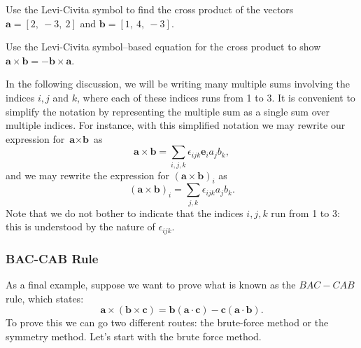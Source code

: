 \begin{exercise}{}
Use the Levi-Civita symbol to find the cross product of the vectors $\textbf{a}=[2,~-3,~2]$ and $\textbf{b}=[1,~4,~-3]$.
\end{exercise}

\begin{exercise}{}
Use the Levi-Civita symbol--based equation for the cross product to show $\textbf{a} \times \textbf{b} = -\textbf{b} \times \textbf{a}$.
\end{exercise}   

In the following discussion, we will be writing many multiple sums involving the indices $i,j$ and $k$, where each of these indices runs from 1 to 3. It is convenient to simplify the notation by representing the multiple sum as a single sum over multiple indices. For instance, with this simplified notation we may rewrite our expression for 
$\textbf{a} \times \textbf{b}$ as
\[\textbf{a} \times \textbf{b} =  \sum_{i,j,k} \epsilon_{ijk} \textbf{e}_i  a_j b_k, \]
and we may rewrite the expression for 
$(\textbf{a} \times \textbf{b})_i$ as
\[ (\textbf{a} \times \textbf{b})_i = \sum_{j,k} \epsilon_{ijk} a_j b_k. \]
Note that we do not bother to indicate that the indices $i,j,k$ run from 1 to 3: this is understood by the nature of $\epsilon_{ijk}$.

\subsubsection*{BAC-CAB Rule}
As a final example, suppose we want to prove what is known as the $BAC-CAB$ rule, which states:
\[ \textbf{a} \times \left( \textbf{b} \times \textbf{c} \right) = \textbf{b} \left( \textbf{a} \cdot \textbf{c} \right) - \textbf{c} \left( \textbf{a} \cdot \textbf{b} \right). \]
To prove this we can go two different routes: the brute-force method or the symmetry method.  Let's start with the brute force method.

